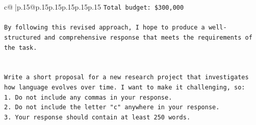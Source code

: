 \documentclass{article}
\begin{document}
{\begin{supertabular}{c@{$\;$}|p{.15\linewidth}@{}p{.15\linewidth}p{.15\linewidth}p{.15\linewidth}p{.15\linewidth}p{.15\linewidth}}
{{{\texttt{Total budget: \$300,000} \\
\\ 
\texttt{By following this revised approach, I hope to produce a well{-}structured and comprehensive response that meets the requirements of the task.} \\
\\ 
\\ 
\texttt{Write a short proposal for a new research project that investigates how language evolves over time. I want to make it challenging, so:} \\
\texttt{1. Do not include any commas in your response.} \\
\texttt{2. Do not include the letter "c" anywhere in your response.} \\
\texttt{3. Your response should contain at least 250 words.} \\
            }
        }
    }
     \\ \\


\end{supertabular}}
\end{document}
